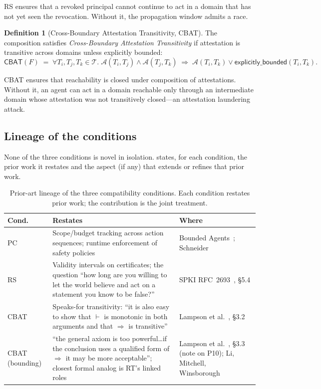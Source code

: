 \documentclass[11pt,a4paper]{article}
\theoremstyle{plain}
\theoremstyle{definition}
\newtheorem{definition}[theorem]{Definition}
\theoremstyle{remark}
\begin{document}
RS ensures that a revoked principal cannot continue to act in a domain that
has not yet seen the revocation. Without it, the propagation window admits a
race.

\begin{definition}[Cross-Boundary Attestation Transitivity, CBAT]
\label{def:cbat}
The composition satisfies \emph{Cross-Boundary Attestation Transitivity} if
attestation is transitive across domains unless explicitly bounded:
\begin{equation*}
\mathsf{CBAT}(F) \;=\; \forall T_i, T_j, T_k \in \mathcal{T}.\;
\mathcal{A}(T_i, T_j) \wedge \mathcal{A}(T_j, T_k) \;\Rightarrow\;
\mathcal{A}(T_i, T_k) \vee \mathsf{explicitly\_bounded}(T_i, T_k).
\end{equation*}
\end{definition}

CBAT ensures that reachability is closed under composition of attestations.
Without it, an agent can act in a domain reachable only through an
intermediate domain whose attestation was not transitively closed---an
attestation laundering attack.

\subsection{Lineage of the conditions}
\label{sec:lineage}

None of the three conditions is novel in isolation.  states,
for each condition, the prior work it restates and the aspect (if any) that
extends or refines that prior work.

\begin{table}[t]
\centering
\small
\begin{tabular}{@{}p{0.7cm}p{6.4cm}p{5.8cm}@{}}
\toprule
\textbf{Cond.} & \textbf{Restates} & \textbf{Where} \\
\midrule
PC & Scope/budget tracking across action sequences; runtime enforcement of safety policies & Bounded Agents~\cite{boundedagents2026}; Schneider~\cite{schneider2000enforceable} \\
RS & Validity intervals on certificates; the question ``how long are you willing to let the world believe and act on a statement you know to be false?'' & SPKI RFC~2693~\cite{rfc2693spki}, \S5.4 \\
CBAT & Speaks-for transitivity: ``it is also easy to show that $\vdash$ is monotonic in both arguments and that $\Rightarrow$ is transitive'' & Lampson et al.~\cite{lampson1992authentication}, \S3.2 \\
CBAT (bounding) & ``the general axiom is too powerful\ldots if the conclusion uses a qualified form of $\Rightarrow$ it may be more acceptable''; closest formal analog is RT's linked roles & Lampson et al.~\cite{lampson1992authentication}, \S3.3 (note on P10); Li, Mitchell, Winsborough~\cite{rt2002} \\
\bottomrule
\end{tabular}
\caption{Prior-art lineage of the three compatibility conditions. Each condition
restates prior work; the contribution is the joint treatment.}
\label{tab:lineage}
\end{table}
\end{document}
